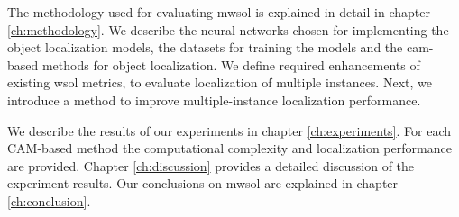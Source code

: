 The methodology used for evaluating \acrlong{mwsol} is explained in detail in chapter \ref{ch:methodology}. We describe the neural networks chosen for implementing the object localization models, the datasets for training the models and the \acrshort{cam}-based methods for object localization. We define required enhancements of existing \acrshort{wsol} metrics, to evaluate localization of multiple instances. Next, we introduce a method to improve multiple-instance localization performance.

We describe the results of our experiments in chapter \ref{ch:experiments}. For each CAM-based method the computational complexity and localization performance are provided. Chapter \ref{ch:discussion} provides a detailed discussion of the experiment results. Our conclusions on \acrshort{mwsol} are explained in chapter \ref{ch:conclusion}.